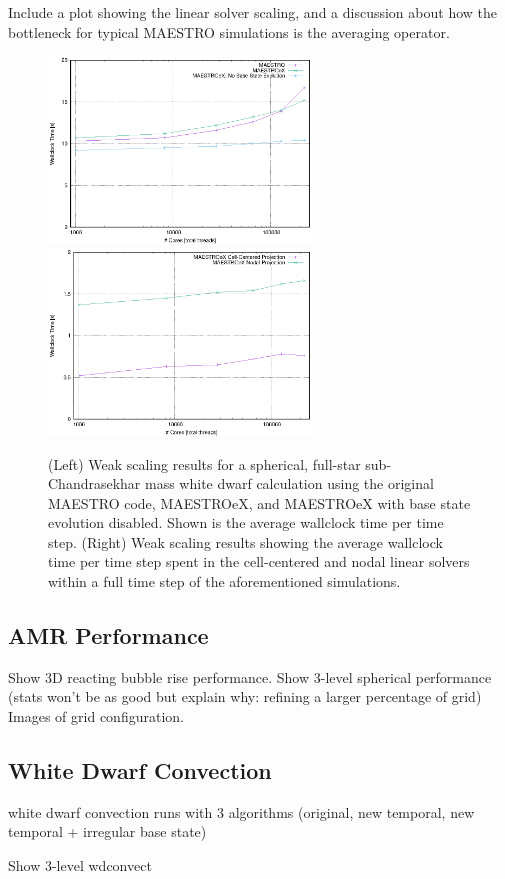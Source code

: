 Include a plot showing the linear solver scaling, and a discussion about how the bottleneck for typical MAESTRO simulations is the averaging operator.


\begin{figure}[htb]
\begin{center}
\includegraphics[width=2.75in]{./figs/MAESTRO_scaling1}
\includegraphics[width=2.75in]{./figs/MAESTRO_scaling2}
\caption{\label{fig:scaling} (Left) Weak scaling results for a spherical, full-star sub-Chandrasekhar mass white dwarf calculation using the original MAESTRO code, MAESTROeX, and MAESTROeX with base state evolution disabled.  Shown is the average wallclock time per time step.
(Right) Weak scaling results showing the average wallclock time per time step spent in the cell-centered and nodal linear solvers within a full time step of the aforementioned simulations.}
\end{center}
\end{figure}


\subsection{AMR Performance}
Show 3D reacting bubble rise performance.
Show 3-level spherical performance (stats won't be as good but explain why: refining a larger percentage of grid)
Images of grid configuration.

\subsection{White Dwarf Convection}
white dwarf convection runs with 3 algorithms (original, new temporal, new temporal + irregular base state)

Show 3-level wdconvect
